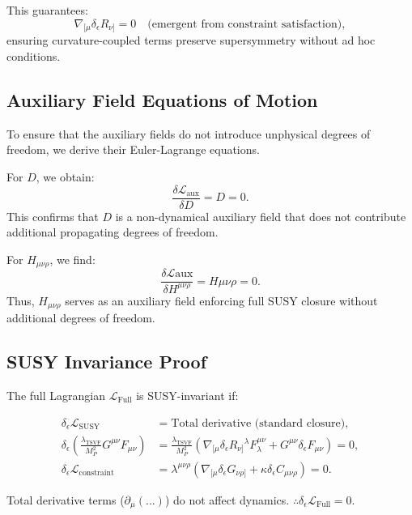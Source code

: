 \documentclass[12pt, onecolumn]{article}
\theoremstyle{definition}
\newcommand{\tsvf}{\lambda_{\mathrm{TSVF}}}
\numberwithin{equation}{section}
\begin{document}
This guarantees:
\begin{equation}
\nabla_{[\mu}\delta_\epsilon R_{\nu]} = 0 \quad \text{(emergent from constraint satisfaction)},
\end{equation}
ensuring curvature-coupled terms preserve supersymmetry without ad hoc conditions.

\subsection{Auxiliary Field Equations of Motion}
To ensure that the auxiliary fields do not introduce unphysical degrees of freedom, we derive their Euler-Lagrange equations.

For $D$, we obtain:
\begin{equation}
\frac{\delta \mathcal{L}_{\text{aux}}}{\delta D} = D = 0.
\end{equation}
This confirms that $D$ is a non-dynamical auxiliary field that does not contribute additional propagating degrees of freedom.

For $H_{\mu\nu\rho}$, we find:
\begin{equation}
\frac{\delta \mathcal{L}{\text{aux}}}{\delta H^{\mu\nu\rho}} = H{\mu\nu\rho} = 0.
\end{equation}
Thus, $H_{\mu\nu\rho}$ serves as an auxiliary field enforcing full SUSY closure without additional degrees of freedom.

\subsection{SUSY Invariance Proof}  
\label{subsec:susy-proof}

The full Lagrangian \(\mathcal{L}_{\text{Full}}\) is SUSY-invariant if:  

\begin{align}
\delta_\epsilon \mathcal{L}_{\text{SUSY}} &= \text{Total derivative (standard closure)}, \\
\delta_\epsilon \left(\frac{\tsvf}{M_P^2} G^{\mu\nu} F_{\mu\nu} \right) 
&= \frac{\tsvf}{M_P^2} \left( \nabla_{[\mu} \delta_\epsilon R_{\nu]}{}^{\lambda} F_{\lambda}^{\mu\nu} 
+ G^{\mu\nu} \delta_\epsilon F_{\mu\nu} \right) = 0, \\
\delta_\epsilon \mathcal{L}_{\text{constraint}} &= \lambda^{\mu\nu\rho} 
\left( \nabla_{[\mu} \delta_\epsilon G_{\nu\rho]} + \kappa \delta_\epsilon C_{\mu\nu\rho} \right) = 0.
\end{align}

Total derivative terms (\(\partial_\mu(...)\)) do not affect dynamics.  
\(\therefore \delta_\epsilon \mathcal{L}_{\text{Full}} = 0\).
\end{document}
